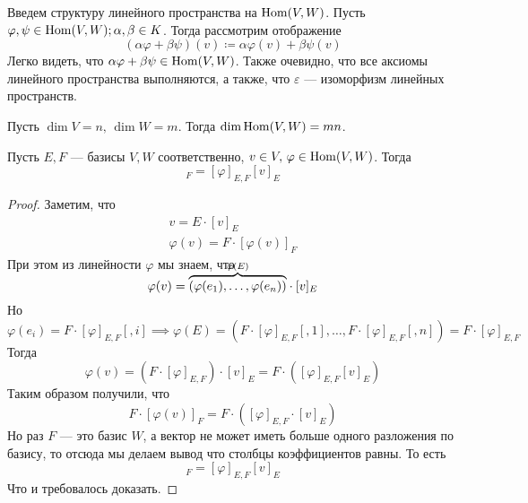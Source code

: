 \documentclass[../main.tex]{subfiles}
\begin{document}
Введем структуру линейного пространства на $\operatorname{Hom}(V, W)$.
Пусть $\varphi, \psi \in \operatorname{Hom}(V, W); \alpha, \beta \in K$. Тогда рассмотрим отображение
\begin{equation*}
  (\alpha \varphi + \beta \psi)(v) \coloneqq \alpha \varphi(v) + \beta \psi(v)
\end{equation*}
Легко видеть, что $\alpha \varphi + \beta \psi \in \operatorname{Hom}(V, W)$. Также очевидно, что все аксиомы линейного пространства выполняются, а также, что $\varepsilon$ --- изоморфизм линейных пространств.

\begin{corollary*}
  Пусть $\dim V = n,\, \dim W = m$. Тогда $\dim \operatorname{Hom}(V, W) = mn$.
\end{corollary*}

\begin{theorem-non}
\label{non:7.2}
  Пусть $E, F$ --- базисы $V, W$ соответственно, $v \in V,\, \varphi \in \operatorname{Hom}(V, W)$.
  Тогда
  \begin{equation*}
    [\varphi(v)]_F = [\varphi]_{E, F} [v]_E
  \end{equation*}
\end{theorem-non}
\begin{proof}
  Заметим, что
  \begin{equation*}
    \begin{gathered}
      v = E \cdot [v]_E  \\
      \varphi(v) = F \cdot [\varphi(v)]_F
    \end{gathered}
  \end{equation*}
  При этом из линейности $\varphi$ мы знаем, что
  \begin{equation*}
    \varphi(v) =
    \smash{\overbrace{(\varphi(e_1), \dotsc, \varphi(e_n))}^{\mathclap{\varphi(E)}}}
    \cdot [v]_E
  \end{equation*}
  Но
  \begin{equation*}
    \varphi(e_i) = F \cdot [\varphi]_{E, F}[,i]
    \implies
    \varphi(E)
    =
    (F \cdot [\varphi]_{E, F}[,1], \dotsc, F \cdot [\varphi]_{E, F}[,n])
    =
    F \cdot [\varphi]_{E, F}
  \end{equation*}
  Тогда
  \begin{equation*}
    \varphi(v)
    =
    (F \cdot [\varphi]_{E, F}) \cdot [v]_E
    =
    F \cdot ([\varphi]_{E, F}[v]_{E})
  \end{equation*}
  Таким образом получили, что
  \begin{equation*}
    F \cdot [\varphi(v)]_F = F \cdot ([\varphi]_{E, F} \cdot [v]_E)
  \end{equation*}
  Но раз $F$ --- это базис $W$, а вектор не может иметь больше одного разложения по базису, то отсюда мы делаем вывод что столбцы коэффициентов равны. То есть
  \begin{equation*}
    [\varphi(v)]_F = [\varphi]_{E, F}[v]_E
  \end{equation*}
  Что и требовалось доказать.
\end{proof}
\end{document}
